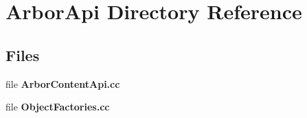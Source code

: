 \section{Arbor\+Api Directory Reference}
\label{dir_d2dbf033959100e5de5c0bfb4d43a584}
\subsection*{Files}
\begin{DoxyCompactItemize}
\item 
file {\bf Arbor\+Content\+Api.\+cc}
\item 
file {\bf Object\+Factories.\+cc}
\end{DoxyCompactItemize}
